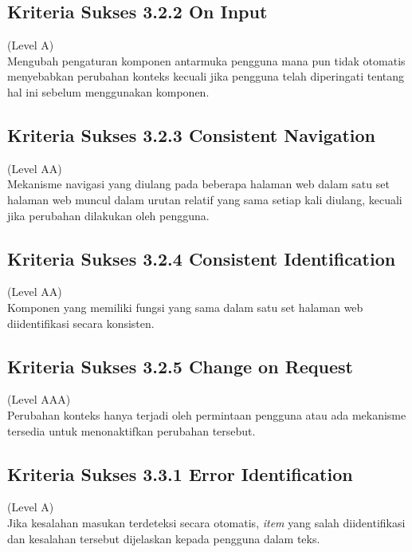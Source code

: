 \subsection{Kriteria Sukses 3.2.2 On Input}
\label{subsec:kriteria_3.2.2}
(Level A) \\

Mengubah pengaturan komponen antarmuka pengguna mana pun tidak otomatis menyebabkan perubahan konteks kecuali jika pengguna telah diperingati tentang hal ini sebelum menggunakan komponen.

\subsection{Kriteria Sukses 3.2.3 Consistent Navigation}
\label{subsec:kriteria_3.2.3}
(Level AA) \\

Mekanisme navigasi yang diulang pada beberapa halaman web dalam satu set halaman web muncul dalam urutan relatif yang sama setiap kali diulang, kecuali jika perubahan dilakukan oleh pengguna.

\subsection{Kriteria Sukses 3.2.4 Consistent Identification}
\label{subsec:kriteria_3.2.4}
(Level AA) \\

Komponen yang memiliki fungsi yang sama dalam satu set halaman web diidentifikasi secara konsisten.

\subsection{Kriteria Sukses 3.2.5 Change on Request}
\label{subsec:kriteria_3.2.5}
(Level AAA) \\

Perubahan konteks hanya terjadi oleh permintaan pengguna atau ada mekanisme tersedia untuk menonaktifkan perubahan tersebut.

\subsection{Kriteria Sukses 3.3.1 Error Identification}
\label{subsec:kriteria_3.3.1}
(Level A) \\

Jika kesalahan masukan terdeteksi secara otomatis, \textit{item} yang salah diidentifikasi dan kesalahan tersebut dijelaskan kepada pengguna dalam teks.

